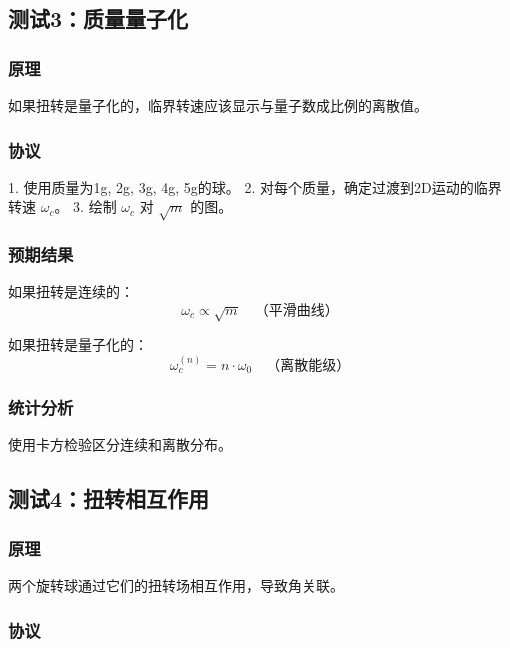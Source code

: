 \documentclass[12pt,a4paper]{article}
\begin{document}
\subsection{测试3：质量量子化}

\subsubsection{原理}

如果扭转是量子化的，临界转速应该显示与量子数成比例的离散值。

\subsubsection{协议}

1. 使用质量为1g, 2g, 3g, 4g, 5g的球。
2. 对每个质量，确定过渡到2D运动的临界转速 $\omega_c$。
3. 绘制 $\omega_c$ 对 $\sqrt{m}$ 的图。

\subsubsection{预期结果}

如果扭转是连续的：
\begin{equation}
    \omega_c \propto \sqrt{m} \quad \text{（平滑曲线）}
\end{equation}

如果扭转是量子化的：
\begin{equation}
    \omega_c^{(n)} = n \cdot \omega_0 \quad \text{（离散能级）}
\end{equation}

\subsubsection{统计分析}

使用卡方检验区分连续和离散分布。

\subsection{测试4：扭转相互作用}

\subsubsection{原理}

两个旋转球通过它们的扭转场相互作用，导致角关联。

\subsubsection{协议}
\end{document}
